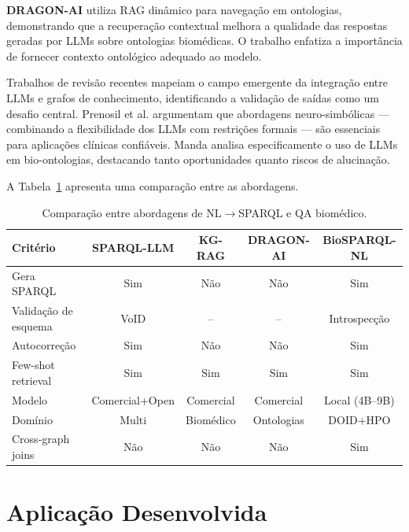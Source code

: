 \documentclass[12pt]{article}
\begin{document}
\textbf{DRAGON-AI} \cite{toro2024dragonai} utiliza RAG din\^{a}mico para navega\c{c}\~{a}o em ontologias, demonstrando que a recupera\c{c}\~{a}o contextual melhora a qualidade das respostas geradas por LLMs sobre ontologias biom\'{e}dicas. O trabalho enfatiza a import\^{a}ncia de fornecer contexto ontol\'{o}gico adequado ao modelo.

Trabalhos de revis\~{a}o recentes \cite{lu2025survey, pan2024unifying} mapeiam o campo emergente da integra\c{c}\~{a}o entre LLMs e grafos de conhecimento, identificando a valida\c{c}\~{a}o de sa\'{i}das como um desafio central. Prenosil et al. \cite{prenosil2025neurosymbolic} argumentam que abordagens neuro-simb\'{o}licas --- combinando a flexibilidade dos LLMs com restri\c{c}\~{o}es formais --- s\~{a}o essenciais para aplica\c{c}\~{o}es cl\'{i}nicas confi\'{a}veis. Manda \cite{manda2025llms} analisa especificamente o uso de LLMs em bio-ontologias, destacando tanto oportunidades quanto riscos de alucina\c{c}\~{a}o.

A Tabela~\ref{tab:comparativo} apresenta uma compara\c{c}\~{a}o entre as abordagens.

\begin{table}[H]
\centering
\caption{Compara\c{c}\~{a}o entre abordagens de NL$\rightarrow$SPARQL e QA biom\'{e}dico.}
\label{tab:comparativo}
\small
\begin{tabular}{lcccc}
\toprule
\textbf{Crit\'{e}rio} & \textbf{SPARQL-LLM} & \textbf{KG-RAG} & \textbf{DRAGON-AI} & \textbf{BioSPARQL-NL} \\
\midrule
Gera SPARQL & Sim & N\~{a}o & N\~{a}o & Sim \\
Valida\c{c}\~{a}o de esquema & VoID & -- & -- & Introspec\c{c}\~{a}o \\
Autocorre\c{c}\~{a}o & Sim & N\~{a}o & N\~{a}o & Sim \\
Few-shot retrieval & Sim & Sim & Sim & Sim \\
Modelo & Comercial+Open & Comercial & Comercial & Local (4B--9B) \\
Dom\'{i}nio & Multi & Biom\'{e}dico & Ontologias & DOID+HPO \\
Cross-graph joins & N\~{a}o & N\~{a}o & N\~{a}o & Sim \\
\bottomrule
\end{tabular}
\end{table}

\section{Aplica\c{c}\~{a}o Desenvolvida}
\label{sec:aplicacao}
\end{document}
